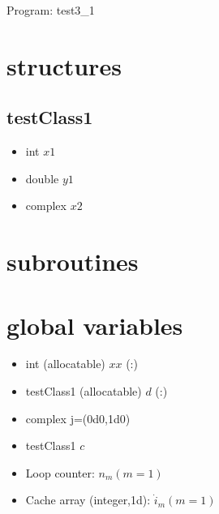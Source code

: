 \documentclass[a4paper,fleqn]{ltjsarticle}
\begin{document}
{\Large Program: test3\_1}

\section{structures}
\subsection{testClass1}\begin{itemize}
  \item int $x1$
  \item double $y1$
  \item complex $x2$
\end{itemize}
\section{subroutines}
\section{global variables}
\begin{itemize}
\item int (allocatable) $xx$ (:)
\item testClass1 (allocatable) $d$ (:)
\item complex $\mathrm{j}$=(0d0,1d0)
\item testClass1 $c$
\item Loop counter: \(n_m (m = 1)\)
\item Cache array (integer,1d): \(\dot{i}_m (m = 1)\)
\end{itemize}
\end{document}
